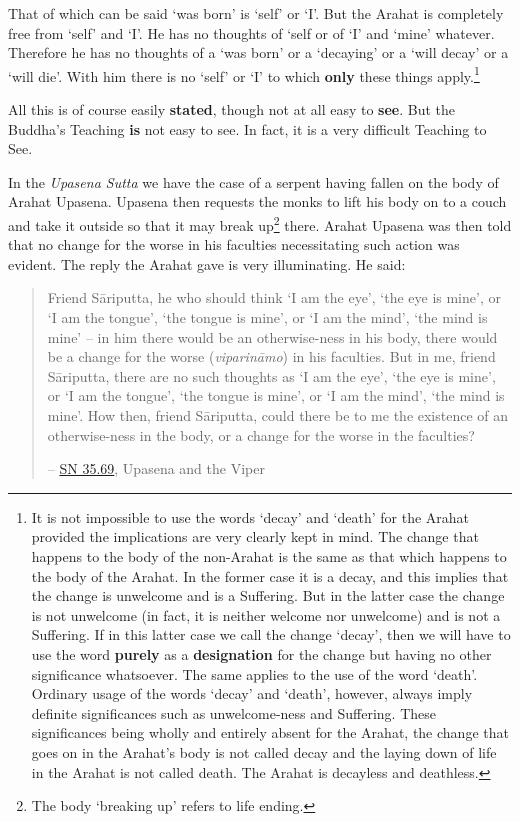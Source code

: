 That of which can be said `was born' is `self' or `I'. But the Arahat is completely free from `self' and `I'. He has no thoughts of `self or of `I' and `mine' whatever. Therefore he has no thoughts of a `was born' or a `decaying' or a `will decay' or a `will die'. With him there is no `self' or `I' to which \textbf{only} these things apply.\footnote{It is not impossible to use the words `decay' and `death' for the Arahat provided the implications are very clearly kept in mind. The change that happens to the body of the non-Arahat is the same as that which happens to the body of the Arahat. In the former case it is a decay, and this implies that the change is unwelcome and is a Suffering. But in the latter case the change is not unwelcome (in fact, it is neither welcome nor unwelcome) and is not a Suffering. If in this latter case we call the change `decay', then we will have to use the word \textbf{purely} as a \textbf{designation} for the change but having no other significance whatsoever. The same applies to the use of the word `death'. Ordinary usage of the words `decay' and `death', however, always imply definite significances such as unwelcome-ness and Suffering. These significances being wholly and entirely absent for the Arahat, the change that goes on in the Arahat's body is not called decay and the laying down of life in the Arahat is not called death. The Arahat is decayless and deathless.}

All this is of course easily \textbf{stated}, though not at all easy to \textbf{see}. But the Buddha's Teaching \textbf{is} not easy to see. In fact, it is a very difficult Teaching to See.

In the \emph{Upasena Sutta} we have the case of a serpent having fallen on the body of Arahat Upasena. Upasena then requests the monks to lift his body on to a couch and take it outside so that it may break up\footnote{The body `breaking up' refers to life ending.} there. Arahat Upasena was then told that no change for the worse in his faculties necessitating such action was evident. The reply the Arahat gave is very illuminating. He said:

\begin{quote}
Friend Sāriputta, he who should think `I am the eye', `the eye is mine', or `I am the tongue', `the tongue is mine', or `I am the mind', `the mind is mine' -- in him there would be an otherwise-ness in his body, there would be a change for the worse (\emph{viparināmo}) in his faculties. But in me, friend Sāriputta, there are no such thoughts as `I am the eye', `the eye is mine', or `I am the tongue', `the tongue is mine', or `I am the mind', `the mind is mine'. How then, friend Sāriputta, could there be to me the existence of an otherwise-ness in the body, or a change for the worse in the faculties?

 -- \href{https://suttacentral.net/sn35.69/en/sujato}{SN 35.69}, Upasena and the Viper
\end{quote}

